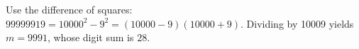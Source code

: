 Use the difference of squares: $ 99999919=10000^2-9^2=(10000-9)(10000+9)$. Dividing by 10009 yields $ m=9991 $, whose digit sum is $\boxed{28}$.
